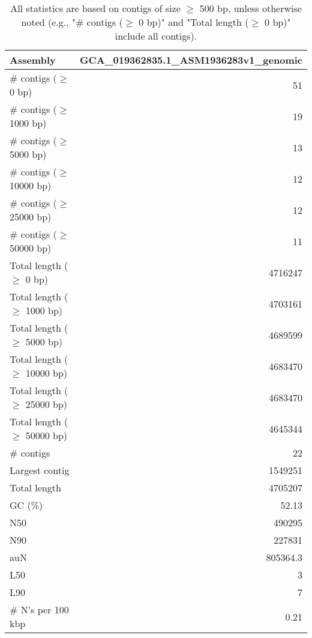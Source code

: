 \documentclass[12pt,a4paper]{article}
\begin{document}
\begin{table}[ht]
\begin{center}
\caption{All statistics are based on contigs of size $\geq$ 500 bp, unless otherwise noted (e.g., "\# contigs ($\geq$ 0 bp)" and "Total length ($\geq$ 0 bp)" include all contigs).}
\begin{tabular}{|l*{1}{|r}|}
\hline
Assembly & GCA\_019362835.1\_ASM1936283v1\_genomic \\ \hline
\# contigs ($\geq$ 0 bp) & 51 \\ \hline
\# contigs ($\geq$ 1000 bp) & 19 \\ \hline
\# contigs ($\geq$ 5000 bp) & 13 \\ \hline
\# contigs ($\geq$ 10000 bp) & 12 \\ \hline
\# contigs ($\geq$ 25000 bp) & 12 \\ \hline
\# contigs ($\geq$ 50000 bp) & 11 \\ \hline
Total length ($\geq$ 0 bp) & 4716247 \\ \hline
Total length ($\geq$ 1000 bp) & 4703161 \\ \hline
Total length ($\geq$ 5000 bp) & 4689599 \\ \hline
Total length ($\geq$ 10000 bp) & 4683470 \\ \hline
Total length ($\geq$ 25000 bp) & 4683470 \\ \hline
Total length ($\geq$ 50000 bp) & 4645344 \\ \hline
\# contigs & 22 \\ \hline
Largest contig & 1549251 \\ \hline
Total length & 4705207 \\ \hline
GC (\%) & 52.13 \\ \hline
N50 & 490295 \\ \hline
N90 & 227831 \\ \hline
auN & 805364.3 \\ \hline
L50 & 3 \\ \hline
L90 & 7 \\ \hline
\# N's per 100 kbp & 0.21 \\ \hline
\end{tabular}
\end{center}
\end{table}
\end{document}
